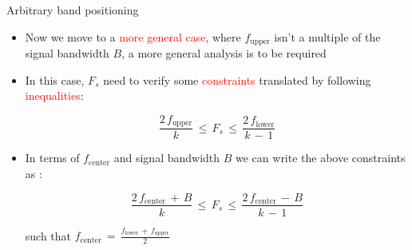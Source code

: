 \documentclass{beamer}
\begin{document}
\begin{frame}[t]{Arbitrary band positioning}

\begin{itemize}
\item Now we move to a \textcolor{red}{more general case}, where  $f_{\text{upper}}$ isn't a multiple of the signal bandwidth $B$, a more general analysis is to be required


\item In this case, $F_s$ need to verify some  \textcolor{red}{constraints} translated by following \textcolor{red}{inequalities}:

\begin{equation}
\displaystyle\frac{2 \, f_{\text{upper}}}{k} \, \leq \, F_s \, \leq \, \displaystyle\frac{2 \, f_{\text{lower}}}{k \, - \, 1}
\end{equation}

\item In terms of $f_{\text{center}}$ and signal bandwidth $B$ we can write the above constraints as \cite{book_understanding_dsp}:

\begin{equation}
\displaystyle\frac{2 \, f_{\text{center}} \, + \, B}{k} \, \leq \, F_s \, \leq \, \displaystyle\frac{2 \, f_{\text{center}} \, - \, B}{k \, - \, 1}
\end{equation}

such that $f_{\text{center}} \, = \, \displaystyle\frac{f_{\text{lower}} \, + \, f_{\text{upper}}}{2}$


\end{itemize}

\end{frame}
\end{document}
